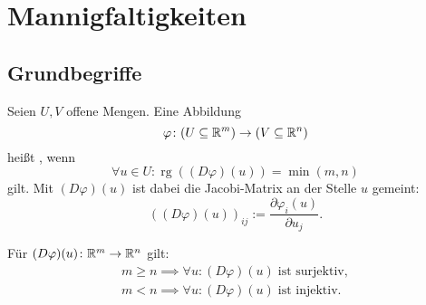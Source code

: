 \section{Mannigfaltigkeiten}
\subsection{Grundbegriffe}
\begin{Definition}
Seien $U,V$ offene Mengen. Eine Abbildung
\begin{equation}
\varphi\colon (U\subseteq\mathbb R^m)\to(V\subseteq\mathbb R^n)
\end{equation}
heißt , wenn
\begin{equation}
\forall u\in U\colon \operatorname{rg}((D\varphi)(u))=\min(m,n)
\end{equation}
gilt. Mit $(D\varphi)(u)$ ist dabei die Jacobi-Matrix an der Stelle
$u$ gemeint:
\begin{equation}
((D\varphi)(u))_{ij} := \frac{\partial\varphi_i(u)}{\partial u_j}.
\end{equation}
\end{Definition}
\noindent
Für $(D\varphi)(u)\colon\mathbb R^m\to\mathbb R^n$ gilt:
\begin{gather}
m{\ge}n\implies\forall u\colon (D\varphi)(u)\;\text{ist surjektiv},\\
m{<}n\implies\forall u\colon (D\varphi)(u)\;\text{ist injektiv}.
\end{gather}


